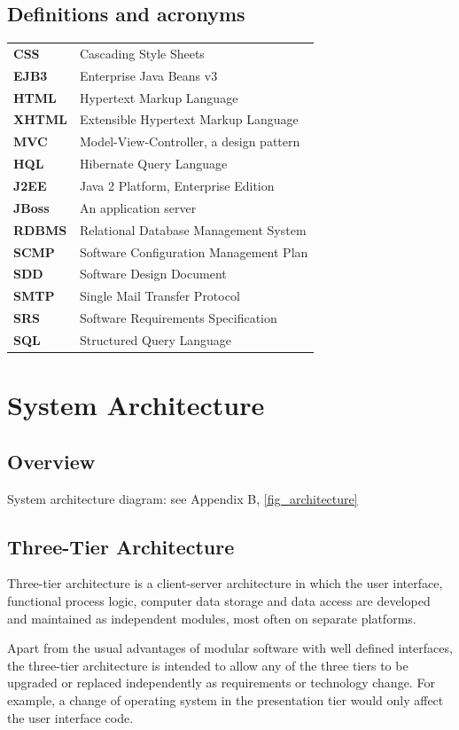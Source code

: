 \documentclass[salesmen, twoside]{../../../templates/latex/2009/softproj}
\begin{document}
\begin{projdoc}
\section{Definitions and acronyms \label{acronyms}}
\begin{tabular}{ll}
\textbf{CSS}   & Cascading Style Sheets \\
\textbf{EJB3}   & Enterprise Java Beans v3 \\
\textbf{HTML}   & Hypertext Markup Language \\
\textbf{XHTML}   & Extensible Hypertext Markup Language \\
\textbf{MVC}   & Model-View-Controller, a design pattern \\
\textbf{HQL}   & Hibernate Query Language \\
\textbf{J2EE}   & Java 2 Platform, Enterprise Edition \\
\textbf{JBoss}   & An application server \\
\textbf{RDBMS}    & Relational Database Management System \\
\textbf{SCMP}   & Software Configuration Management Plan \\
\textbf{SDD}    & Software Design Document \\
\textbf{SMTP}   & Single Mail Transfer Protocol \\
\textbf{SRS}    & Software Requirements Specification \\
\textbf{SQL}   & Structured Query Language \\
\end{tabular}

\chapter{System Architecture}
\section{Overview}
System architecture diagram: see Appendix B, \ref{fig_architecture}

\section{Three-Tier Architecture}
Three-tier architecture is a client-server architecture in which the user interface, functional process logic, computer data storage and data access are developed and maintained as independent modules, most often on separate platforms.

Apart from the usual advantages of modular software with well defined interfaces, the three-tier architecture is intended to allow any of the three tiers to be upgraded or replaced independently as requirements or technology change. For example, a change of operating system in the presentation tier would only affect the user interface code.


\end{projdoc}
\end{document}
